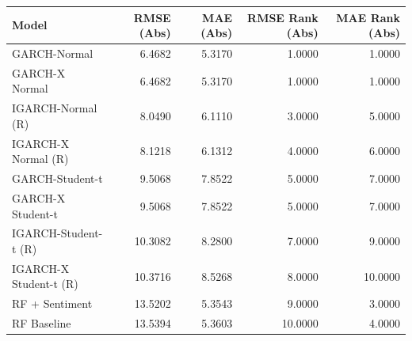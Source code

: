 \begin{tabular}{lrrrr}
\toprule
Model & RMSE (Abs) & MAE (Abs) & RMSE Rank (Abs) & MAE Rank (Abs) \\
\midrule
GARCH-Normal & 6.4682 & 5.3170 & 1.0000 & 1.0000 \\
GARCH-X Normal & 6.4682 & 5.3170 & 1.0000 & 1.0000 \\
IGARCH-Normal (R) & 8.0490 & 6.1110 & 3.0000 & 5.0000 \\
IGARCH-X Normal (R) & 8.1218 & 6.1312 & 4.0000 & 6.0000 \\
GARCH-Student-t & 9.5068 & 7.8522 & 5.0000 & 7.0000 \\
GARCH-X Student-t & 9.5068 & 7.8522 & 5.0000 & 7.0000 \\
IGARCH-Student-t (R) & 10.3082 & 8.2800 & 7.0000 & 9.0000 \\
IGARCH-X Student-t (R) & 10.3716 & 8.5268 & 8.0000 & 10.0000 \\
RF + Sentiment & 13.5202 & 5.3543 & 9.0000 & 3.0000 \\
RF Baseline & 13.5394 & 5.3603 & 10.0000 & 4.0000 \\
\bottomrule
\end{tabular}
